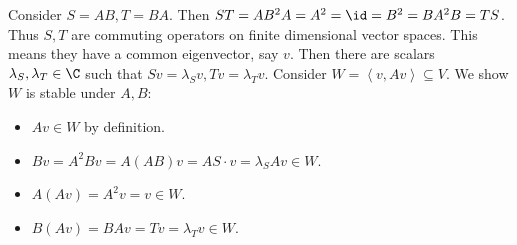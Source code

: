 \begin{sol}
Consider $S=AB, T=BA$. Then $ST = AB^2A = A^2 = \id = B^2 = BA^2B = TS$. Thus $S,T$ are commuting operators on finite dimensional vector spaces. This means they have a common eigenvector, say $v$. Then there are scalars $\lambda_S, \lambda_T\in\C$ such that $Sv= \lambda_Sv, T v = \lambda_Tv$. Consider $W = \left<v,Av\right>\subseteq V$. We show $W$ is stable under $A,B$:\begin{itemize}
\item $A v \in W$ by definition.
\item $B v = A^2 B v = A(AB) v = AS\cdot v = \lambda_S Av \in W$.
\item $A(Av) = A^2 v = v \in W$.
\item $B(Av) = BA v = Tv = \lambda_T v \in W$.
\end{itemize}
\end{sol}